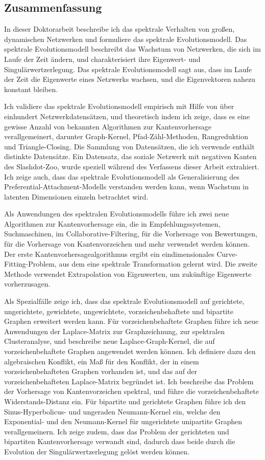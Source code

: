 \documentclass[11pt,a4paper]{book}
\begin{document}
\begin{spacing}{1.3}
\clearpage
{}
\section*{Zusammenfassung}
In dieser Doktorarbeit beschreibe ich das spektrale Verhalten von
großen, dynamischen Netzwerken und formuliere das spektrale
Evolutionsmodell. 
Das spektrale Evolutionsmodell beschreibt das Wachstum von Netzwerken,
die sich im Laufe der Zeit ändern, und charakterisiert ihre Eigenwert-
und Singulärwertzerlegung. 
Das spektrale Evolutionsmodell sagt aus, dass im Laufe der Zeit die
Eigenwerte eines Netzwerks wachsen, und die Eigenvektoren nahezu
konstant bleiben. 

Ich validiere das spektrale Evolutionsmodell empirisch mit Hilfe von
über einhundert Netzwerkdatensätzen, und theoretisch indem ich zeige,
dass es eine gewisse Anzahl von bekannten Algorithmen zur Kantenvorhersage
verallgemeinert, darunter Graph-Kernel, Pfad-Zähl-Methoden,
Rangreduktion und Triangle-Closing. 
Die Sammlung von Datensätzen, die ich verwende enthält
distinkte Datensätze.  Ein Datensatz, das soziale
Netzwerk mit negativen 
Kanten des Slashdot-Zoo, wurde speziell während des Verfassens dieser
Arbeit extrahiert. 
Ich zeige auch, dass das spektrale Evolutionsmodell als Generalisierung
des Preferential-Attachment-Modells verstanden werden kann, wenn
Wachstum in latenten Dimensionen einzeln betrachtet wird. 

Als Anwendungen des spektralen Evolutionsmodells führe ich zwei neue
Algorithmen zur Kantenvorhersage ein, die in Empfehlungssystemen,
Suchmaschinen, im Collaborative-Filtering, für die Vorhersage von Bewertungen,
für die Vorhersage von Kantenvorzeichen und mehr verwendet werden können. 
Der erste Kantenvorhersagealgorithmus ergibt ein eindimensionales
Curve-Fitting-Problem, aus dem eine spektrale Transformation gelernt
wird. 
Die zweite Methode verwendet Extrapolation von Eigenwerten, um zukünftige
Eigenwerte vorherzusagen. 

Als Spezialfälle zeige ich, dass das spektrale Evolutionsmodell auf
gerichtete, ungerichtete, gewichtete, ungewichtete, vorzeichenbehaftete
und bipartite Graphen erweitert werden kann. 
Für vorzeichenbehaftete Graphen führe ich neue Anwendungen der
Laplace-Matrix zur Graphzeichnung, zur spektralen Clusteranalyse, und
beschreibe neue Laplace-Graph-Kernel, die auf vorzeichenbehaftete
Graphen angewendet werden können. 
Ich definiere dazu den algebraischen Konflikt, ein Maß für den Konflikt,
der in einem vorzeichenbehafteten Graphen vorhanden ist, und das auf der
vorzeichenbehafteten Laplace-Matrix begründet ist.
Ich beschreibe das Problem der Vorhersage von Kantenvorzeichen
spektral, und führe die vorzeichenbehaftete Widerstands-Distanz ein. 
Für bipartite und gerichtete Graphen führe ich den Sinus-Hyperbolicus-
und ungeraden Neumann-Kernel ein, welche den Exponential- und den
Neumann-Kernel für ungerichtete unipartite Graphen verallgemeinern. 
Ich zeige zudem, dass das Problem  der gerichteten und bipartiten
Kantenvorhersage verwandt sind, dadurch dass beide durch die Evolution
der Singulärwertzerlegung gelöst werden können. 


\end{spacing}
\end{document}

